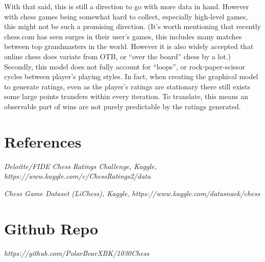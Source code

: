 \documentclass[12pt, letterpaper]{article}
\begin{document}
\begin{multicols}{2}
With that said, this is still a direction to go with more data in hand. However with chess games being somewhat hard to collect, especially high-level games, this might not be such a promising direction. (It’s worth mentioning that recently chess.com has seen surges in their user’s games, this includes many matches between top grandmasters in the world. However it is also widely accepted that online chess does variate from OTB, or “over the board” chess by a lot.)
Secondly, this model does not fully account for “loops”, or rock-paper-scissor cycles between player’s playing styles. In fact, when creating the graphical model to generate ratings, even as the player’s ratings are stationary there still exists some large points transfers within every iteration. To translate, this means an observable part of wins are not purely predictable by the ratings generated.


\section*{References}
\begin{small}
\begin{flushleft}
	\textit{Deloitte/FIDE Chess Ratings Challenge, Kaggle,}
	\textit{https://www.kaggle.com/c/ChessRatings2/data}
	
	\textit{Chess Game Dataset (LiChess), Kaggle,} 
	\textit{https://www.kaggle.com/datasnaek/chess}
\end{flushleft}
\end{small}


\section*{Github Repo}
	\textit{https://github.com/PolarBearXBK/1030Chess}
\end{multicols}	

\end{document}
